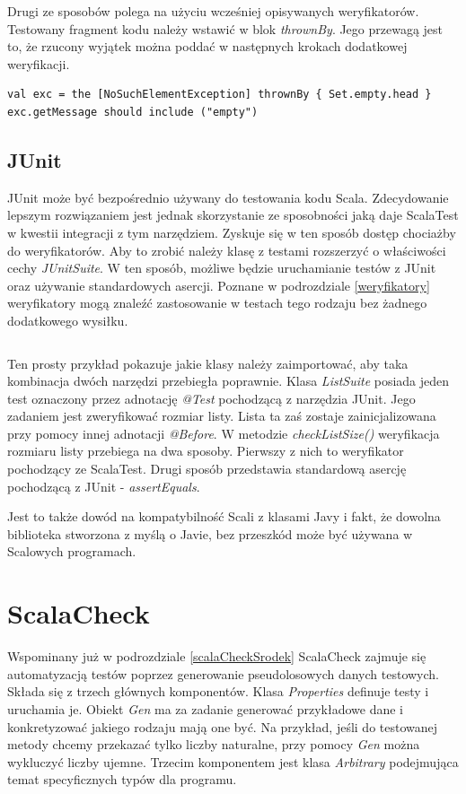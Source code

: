 \documentclass[brudnopis]{xmgr}
\begin{document}
Drugi ze sposobów polega na użyciu wcześniej opisywanych weryfikatorów. Testowany fragment kodu należy wstawić w blok \emph{thrownBy}. Jego przewagą jest to, że rzucony wyjątek można poddać w następnych krokach dodatkowej weryfikacji.

\begin{verbatim}
val exc = the [NoSuchElementException] thrownBy { Set.empty.head }
exc.getMessage should include ("empty")
\end{verbatim}

\subsection{JUnit}

JUnit może być bezpośrednio używany do testowania kodu Scala. Zdecydowanie lepszym rozwiązaniem jest jednak skorzystanie ze sposobności jaką daje ScalaTest w kwestii integracji z tym narzędziem. Zyskuje się w ten sposób dostęp chociażby do weryfikatorów. Aby to zrobić należy klasę z testami rozszerzyć o właściwości cechy \emph{JUnitSuite}. W ten sposób, możliwe będzie uruchamianie testów z JUnit oraz używanie standardowych asercji. Poznane w podrozdziale \ref{weryfikatory} weryfikatory mogą znaleźć zastosowanie w testach tego rodzaju bez żadnego dodatkowego wysiłku. 

\inputminted[fontsize=\small]{scala}{code/ListSuite.scala}

Ten prosty przykład pokazuje jakie klasy należy zaimportować, aby taka kombinacja dwóch narzędzi przebiegła poprawnie. Klasa \emph{ListSuite} posiada jeden test oznaczony przez adnotację \emph{@Test} pochodzącą z narzędzia JUnit. Jego zadaniem jest zweryfikować rozmiar listy. Lista ta zaś zostaje zainicjalizowana przy pomocy innej adnotacji \emph{@Before}. W metodzie \emph{checkListSize()} weryfikacja rozmiaru listy przebiega na dwa sposoby. Pierwszy z nich to weryfikator pochodzący ze ScalaTest. Drugi sposób przedstawia standardową asercję pochodzącą z JUnit - \emph{assertEquals}.

Jest to także dowód na kompatybilność Scali z klasami Javy i fakt, że dowolna biblioteka stworzona z myślą o Javie, bez przeszkód może być używana w Scalowych programach.

\section{ScalaCheck}

Wspominany już w podrozdziale \ref{scalaCheckSrodek} ScalaCheck zajmuje się automatyzacją testów poprzez generowanie pseudolosowych danych testowych. Składa się z trzech głównych komponentów.
Klasa \emph{Properties} definuje testy i uruchamia je. Obiekt \emph{Gen} ma za zadanie generować przykładowe dane i konkretyzować jakiego rodzaju mają one być. Na przykład, jeśli do testowanej metody chcemy przekazać tylko liczby naturalne, przy pomocy \emph{Gen} można wykluczyć liczby ujemne. Trzecim komponentem jest klasa \emph{Arbitrary} podejmująca temat specyficznych typów dla programu.
\end{document}
